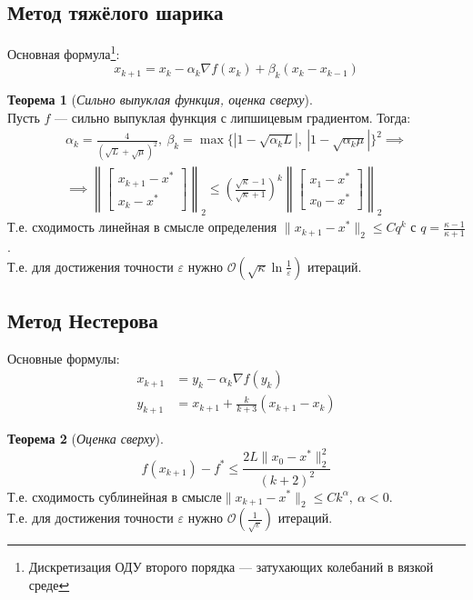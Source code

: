 \documentclass[11pt,a4paper]{report}
\def\eps{\varepsilon}
\def\le{\leqslant}
\theoremstyle{definition}
\theoremstyle{definition}
\newtheorem{theorem}{Теорема}[section]
\theoremstyle{definition}
\begin{document}
	\subsection{Метод тяжёлого шарика}
	Основная формула\footnote{Дискретизация ОДУ второго порядка — затухающих колебаний в вязкой среде}:
	$$
		x_{k+1} = x_{k} - \alpha_k \nabla f(x_k) + \beta_k (x_k - x_{k-1})	
	$$
	\begin{theorem}[\textit{Сильно выпуклая функция, оценка сверху}]$  $\\
		Пусть $ f $ — сильно выпуклая функция с липшицевым градиентом. Тогда:
		\begin{gather*}
			\alpha_k = \frac{4}{(\sqrt{L} + \sqrt{\mu})^2},\ \beta_k = \max \{ |1 - \sqrt{\alpha_k L}|,\ |1 - \sqrt{\alpha_k \mu}|\}^2 \implies \\
			\implies \left \| \begin{bmatrix}
				x_{k+1} - x^{*}\\
				x_{k} - x^{*}
			\end{bmatrix} \right \|_{2} \le \left( \frac{\sqrt{\kappa} - 1}{\sqrt{\kappa} + 1} \right) ^ k \left \| \begin{bmatrix}
			x_{1} - x^{*}\\
			x_{0} - x^{*}
			\end{bmatrix} \right \|_{2}
		\end{gather*}
		Т.е. сходимость линейная в смысле определения $ \| x_{k+1} - x^{*} \|_2 \le Cq^{k}$ с $ q = \frac{\kappa - 1}{\kappa + 1} $.\\
		Т.е. для достижения точности $ \eps $ нужно $ \mathcal{O}\left( \sqrt{\kappa} \ln \frac{1}{\eps} \right) $ итераций.
	\end{theorem}
	\subsection{Метод Нестерова}
	Основные формулы:
	\begin{align*}
		x_{k+1} &= y_{k} - \alpha_k \nabla f(y_{k})\\
		y_{k+1} &= x_{k+1} + \frac{k}{k+3} (x_{k+1} - x_{k})
	\end{align*}
	\begin{theorem}[\textit{Оценка сверху}]$  $\\
		$$
			f(x_{k+1}) - f^{*} \le \frac{2L \| x_{0} - x^{*} \|_2^2 }{(k+2)^2}
		$$
		Т.е. сходимость сублинейная в смысле$ \| x_{k+1} - x^{*} \|_2 \le Ck^{\alpha},\ \alpha < 0 $.\\
		Т.е. для достижения точности $ \eps $ нужно $ \mathcal{O}\left( \frac{1}{\sqrt{\eps}} \right) $ итераций.
	\end{theorem}
\end{document}
